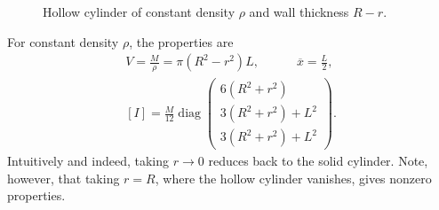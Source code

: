 \documentclass[11pt,dvipsnames]{thesis}
\begin{document}
\begin{figure}[H]
\begin{subfigure}[t]{0.5\textwidth}
\end{subfigure}
\caption{Hollow cylinder of constant density $\rho$ and wall thickness $R - r$.}
\end{figure}
For constant density $\rho$, the properties are
\begin{gather}
V = \frac{M}{\rho} = \pi (R^2 - r^2) L, \qquad\quad \overline{x} = \frac{L}{2}, \label{eq:StructuresHollowCylinderVolumeAndCOM}\\ 
[I] = \frac{M}{12} \operatorname{diag}\begin{pmatrix}6(R^2 + r^2) \\ 3(R^2 + r^2) + L^2 \\ 3(R^2 + r^2) + L^2\end{pmatrix}. \label{eq:StructuresHollowCylinderInertiaTensorwrtCOM}
\end{gather}
Intuitively and indeed, taking $r \to 0$ reduces back to the solid cylinder. Note, however, that taking $r = R$, where the hollow cylinder vanishes, gives nonzero properties.
\end{document}
